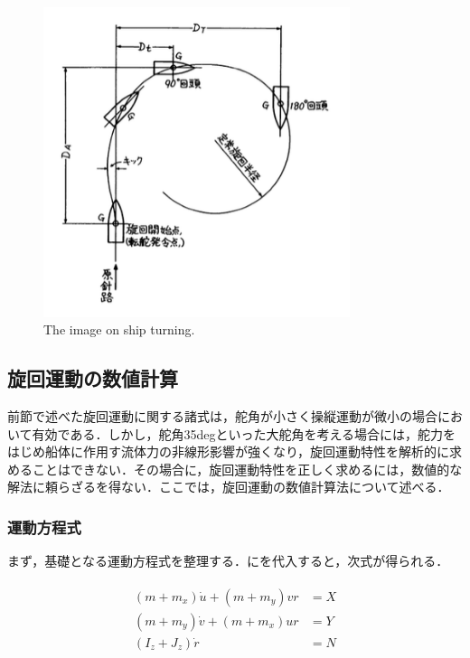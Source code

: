 \begin{figure}[htbp]
    \centering   
    \includegraphics[width=0.8\textwidth]{./img/2-3.png}
    \caption{The image on ship turning.}
    \label{fig:2-3_png}
\end{figure}

\subsection{旋回運動の数値計算}

前節で述べた旋回運動に関する諸式は，舵角が小さく操縦運動が微小の場合において有効である．しかし，舵角35degといった大舵角を考える場合には，舵力をはじめ船体に作用す流体力の非線形影響が強くなり，旋回運動特性を解析的に求めることはできない．その場合に，旋回運動特性を正しく求めるには，数値的な解法に頼らざるを得ない．ここでは，旋回運動の数値計算法について述べる．

\subsubsection{運動方程式}

まず，基礎となる運動方程式を整理する．にを代入すると，次式が得られる．

\begin{align}
    \begin{split}
        \left(m+m_{x}\right) \dot{u}+\left(m+m_{y}\right) v r&=X \\
        \left(m+m_{y}\right) \dot{v}+\left(m+m_{x}\right) u r&=Y \\
        \left(I_{z}+J_{z}\right) \dot{r}&=N \label{eq:2-51}
    \end{split}
\end{align}

